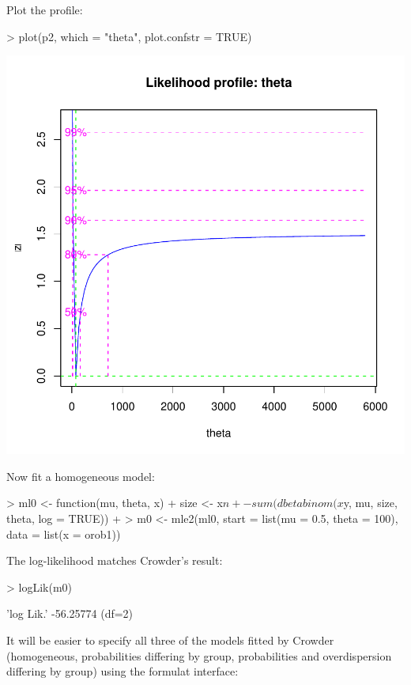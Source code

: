 \documentclass{article}
\begin{document}
Plot the profile:
\begin{Schunk}
\begin{Sinput}
> plot(p2, which = "theta", plot.confstr = TRUE)
\end{Sinput}
\end{Schunk}
\includegraphics{mle2-025}

Now fit a homogeneous model:
\begin{Schunk}
\begin{Sinput}
> ml0 <- function(mu, theta, x) {
+     size <- x$n
+     -sum(dbetabinom(x$y, mu, size, theta, log = TRUE))
+ }
> m0 <- mle2(ml0, start = list(mu = 0.5, theta = 100), data = list(x = orob1))
\end{Sinput}
\end{Schunk}

The log-likelihood matches Crowder's result:
\begin{Schunk}
\begin{Sinput}
> logLik(m0)
\end{Sinput}
\begin{Soutput}
'log Lik.' -56.25774 (df=2)
\end{Soutput}
\end{Schunk}

It will be easier to specify all three of the models
fitted by Crowder (homogeneous, probabilities differing
by group, probabilities and overdispersion differing
by group) using the formulat interface:
\end{document}
